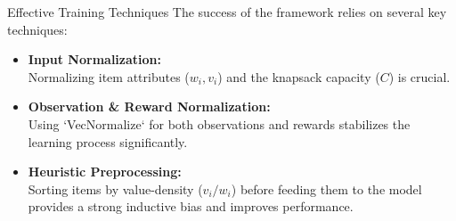 \begin{frame}
\begin{columns}[T]
        \begin{column}{0.5\textwidth}
            \begin{alertblock}{Effective Training Techniques}
                The success of the framework relies on several key techniques:
                \begin{itemize}
                    \item \textbf{Input Normalization:} \\
                    Normalizing item attributes ($w_i, v_i$) and the knapsack capacity ($C$) is crucial. \vspace{1em}
                    
                    \item \textbf{Observation \& Reward Normalization:} \\
                    Using `VecNormalize` for both observations and rewards stabilizes the learning process significantly. \vspace{1em}
                    
                    \item \textbf{Heuristic Preprocessing:} \\
                    Sorting items by value-density ($v_i / w_i$) before feeding them to the model provides a strong inductive bias and improves performance.
                \end{itemize}
            \end{alertblock}
        \end{column}
    \end{columns}
\end{frame}

